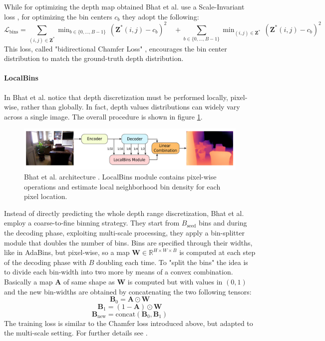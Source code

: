 While for optimizing the depth map obtained Bhat et al. use a Scale-Invariant loss \cite{Eigen}, for optimizing the bin centers $c_{b}$ they adopt the following:
\[
	\mathcal{L}_{\text{bins}} =
	\sum_{(i, j) \in \mathbf{Z}^{*}} \mathop{\text{min}}_{b \in \{0, \dotsc, B-1\}} \, (\mathbf{Z}^{*}(i, j) - c_{b})^{2} \quad+
	\sum_{b \in \{0, \dotsc, B-1\}} \mathop{\text{min}}_{(i, j) \in \mathbf{Z}^{*}} \, (\mathbf{Z}^{*}(i, j) - c_{b})^{2}
\]
This loss, called "bidirectional Chamfer Loss" \cite{AdaBins}, encourages the bin center distribution to match the ground-truth depth distribution.


\paragraph{LocalBins} In \cite{LocalBins} Bhat et al. notice that depth discretization must be performed locally, pixel-wise, rather than globally.
In fact, depth values distributions can widely vary across a single image.
The overall procedure is shown in figure \ref{fig:localbins}.

\begin{figure}
	\centering
	\includegraphics[scale=0.3]{figs/localbins}
	\caption{Bhat et al. architecture \cite{LocalBins}. LocalBins module contains pixel-wise operations and estimate local neighborhood bin density for each pixel location. \label{fig:localbins}}
\end{figure}

Instead of directly predicting the whole depth range discretization, Bhat et al. employ a coarse-to-fine binning strategy.
They start from $B_{\text{seed}}$ bins and during the decoding phase, exploiting multi-scale processing, they apply a bin-splitter module that doubles the number of bins.
Bins are specified through their widths, like in AdaBins, but pixel-wise, so a map $\mathbf{W} \in \mathbb{R}^{H \times W \times B}$ is computed at each step of the decoding phase with $B$ doubling each time.
To "split the bins" the idea is to divide each bin-width into two more by means of a convex combination.
Basically a map $\mathbf{A}$ of same shape as $\mathbf{W}$ is computed but with values in $(0, 1)$ and the new bin-widths are obtained by concatenating the two following tensors:
\[
	\mathbf{B}_{0} = \mathbf{A} \odot \mathbf{W}
\]\[
	\mathbf{B}_{1} = (1 - \mathbf{A}) \odot \mathbf{W}
\]\[
	\mathbf{B}_{\text{new}} = \text{concat} (\mathbf{B}_{0}, \mathbf{B}_{1})
\]
The training loss is similar to the Chamfer loss introduced above, but adapted to the multi-scale setting.
For further details see \cite{LocalBins}.

